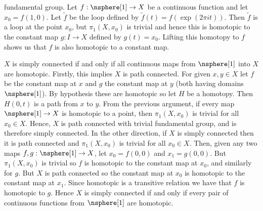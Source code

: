 \documentclass{article}                                                        %
\begin{document}
\begin{solution}
        fundamental group. Let $f:\nsphere[1]\rightarrow{X}$ be a continuous
        function and let $x_{0}=f(1,0)$. Let $\tilde{f}$ be the loop defined by
        $\tilde{f}(t)=f(\exp(2\pi{i}t))$. Then $\tilde{f}$ is a loop at the
        point $x_{0}$, but $\pi_{1}(X,x_{0})$ is trivial and hence this is
        homotopic to the constant map $g:I\rightarrow{X}$ defined by
        $g(t)=x_{0}$. Lifting this homotopy to $f$ shows us that $f$ is also
        homotopic to a constant map.
        \par\hfill\par
        $X$ is simply connected if and only if all continuous maps from
        $\nsphere[1]$ into $X$ are homotopic. Firstly, this implies $X$ is
        path connected. For given $x,y\in{X}$ let $f$ be the constant map at
        $x$ and $g$ the constant map at $y$ (both having domains $\nsphere[1]$).
        By hypothesis these are homotopic so let $H$ be a homotopy. Then
        $H(0,t)$ is a path from $x$ to $y$. From the previous argument, if every
        map $\nsphere[1]\rightarrow{X}$ is homotopic to a point, then
        $\pi_{1}(X,x_{0})$ is trivial for all $x_{0}\in{X}$. Hence, $X$ is path
        connected with trivial fundamental group, and is therefore simply
        connected. In the other direction, if $X$ is simply connected then it is
        path connected and $\pi_{1}(X,x_{0})$ is trivial for all $x_{0}\in{X}$.
        Then, given any two maps $f,g:\nsphere[1]\rightarrow{X}$, let
        $x_{0}=f(0,0)$ and $x_{1}=g(0,0)$. But $\pi_{1}(X,x_{0})$ is trivial so
        $f$ is homotopic to the constant map at $x_{0}$, and similarly for
        $g$. But $X$ is path connected so the constant map at $x_{0}$ is
        homotopic to the constant map at $x_{1}$. Since homotopic is a
        transitive relation we have that $f$ is homotopic to $g$. Hence $X$ is
        simply connected if and only if every pair of continuous functions
        from $\nsphere[1]$ are homotopic.
    \end{solution}
\end{document}
